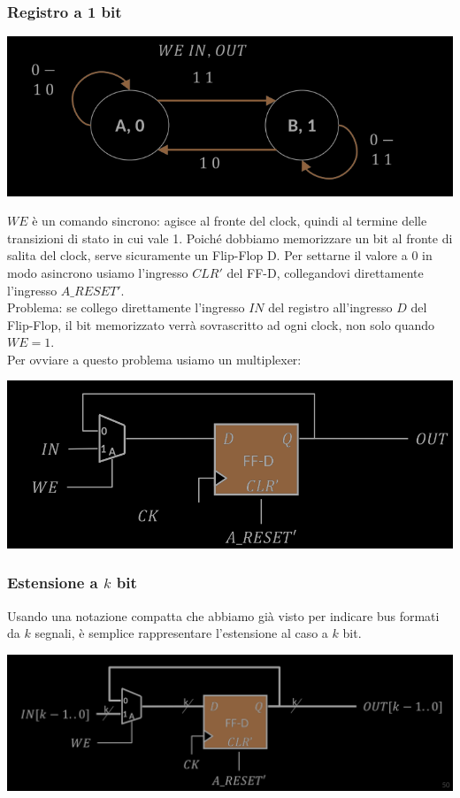 \documentclass{article}
\begin{document}
\subsubsection*{Registro a 1 bit}
\begin{center}
    \includegraphics[scale=0.35]{grafo registro 1 bit.png}
\end{center}
$WE$ è un comando sincrono: agisce al fronte del clock, quindi al termine delle transizioni di stato in cui vale 1.
Poiché dobbiamo memorizzare un bit al fronte di salita del clock, serve sicuramente un Flip-Flop D. Per settarne il valore a 0 in modo asincrono usiamo l’ingresso $CLR'$ del FF-D, collegandovi direttamente l’ingresso $A\_RESET'$.\\
Problema: se collego direttamente l'ingresso $IN$ del registro all'ingresso $D$ del Flip-Flop, il bit memorizzato verrà sovrascritto ad ogni clock, non solo quando $WE = 1$.
\vspace{0.2cm}\\
Per ovviare a questo problema usiamo un multiplexer:
\begin{center}
    \includegraphics[scale=0.35]{registro 1 bit multi.png}
\end{center}
\subsubsection*{Estensione a $k$ bit}
Usando una notazione compatta che abbiamo già visto per indicare bus formati da $k$ segnali, è semplice rappresentare l’estensione al caso a $k$ bit.
\begin{center}
    \includegraphics[scale=0.35]{registro k bit.png}
\end{center}
\end{document}
